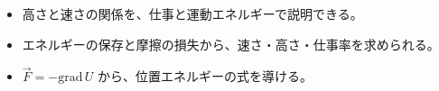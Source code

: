 \makeatletter
\newcommand\pxev[1]{\vec{#1}}
\newcommand\pxecar[3]{\begin{scope}[shift={#1}, rotate=#2]
  \filldraw[fill=#3!35, draw=#3!75!black, line width=0.6pt, rounded corners=0.6mm] (-3.6,1.1) rectangle (3.6,4.4);
  \fill[bkInk!80] (-2.2,0.7) circle (0.9) (2.2,0.7) circle (0.9);\end{scope}}
\newcommand\pxebox[4]{\filldraw[fill=#4!30, draw=#4!70!black, line width=0.6pt] #1 rectangle ++(#2,#3);}
\makeatother


\begin{goal}
\begin{itemize}[label={\color{bkTheme}●}, leftmargin=1.6\zw, itemsep=0pt, topsep=1pt]
\item {}\enspace 高さと速さの関係を、仕事と運動エネルギーで説明できる。
\item {}\enspace エネルギーの保存と摩擦の損失から、速さ・高さ・仕事率を求められる。
\item {}\enspace $\pxev F=-\mathrm{grad}\,U$ から、位置エネルギーの式を導ける。
\end{itemize}
\end{goal}


